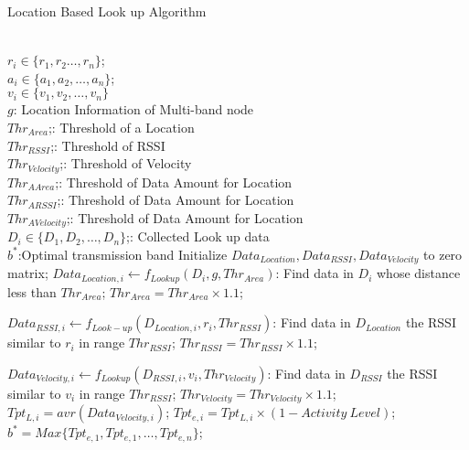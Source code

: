 	  \begin{algorithm}
	  \caption{Location Based Look up Algorithm}
	  \label{algorithms: Location}
	  \begin{algorithmic}[1]
	  \REQUIRE  ~~\\
		  $r_i \in \{r_1,r_2 \dots,r_n\}$;\\
		  $a_i \in \{a_1,a_2, \dots, a_n\}$;\\
		  $v_i \in \{v_1,v_2,\dots,v_n\}$\\
		  $g$: Location Information of Multi-band node\\
		  $Thr_{Area}$;: Threshold of a Location\\
		  $Thr_{RSSI}$;: Threshold of RSSI\\
		  $Thr_{Velocity}$;: Threshold of Velocity\\
		  $Thr_{A Area}$;: Threshold of Data Amount for Location\\
		  $Thr_{A RSSI}$;: Threshold of Data Amount for Location\\
		  $Thr_{A Velocity}$;: Threshold of Data Amount for Location\\
		  $D_i \in \{D_1,D_2,\dots,D_n\}$;: Collected Look up data
\ENSURE ~~\\    
		  $b^*$:Optimal transmission band
\STATE Initialize \emph{$Data_{Location},Data_{RSSI},Data_{Velocity}$} to zero matrix;
\STATE $Data_{Location,i} \leftarrow f_{Lookup}(D_i,g,Thr_{Area})$: Find data in $D_i$ whose distance less than $Thr_{Area}$;
\STATE $Thr_{Area}=Thr_{Area} \times 1.1$;
\ENDWHILE

\STATE $Data_{RSSI,i} \leftarrow f_{Look-up}(D_{Location,i},r_i,Thr_{RSSI})$: Find data in $D_{Location}$ the RSSI similar to $r_i$ in range $Thr_{RSSI}$;
\STATE $Thr_{RSSI}=Thr_{RSSI} \times 1.1$;
\ENDWHILE

\STATE $Data_{Velocity,i} \leftarrow f_{Lookup}(D_{RSSI,i},v_i,Thr_{Velocity})$: Find data in $D_{RSSI}$ the RSSI similar to $v_i$ in range $Thr_{RSSI}$;
\STATE $Thr_{Velocity}=Thr_{Velocity} \times 1.1$;
\ENDWHILE \\

\STATE $Tpt_{L,i}=avr(Data_{Velocity,i})$;
\STATE  $Tpt_{e,i}=Tpt_{L,i}\times(1-Activity \ Level)$;
\ENDFOR \\  
\STATE $b^*=Max\{Tpt_{e,1},Tpt_{e,1},\dots,Tpt_{e,n}\}$;\\
\end{algorithmic}
\end{algorithm}



